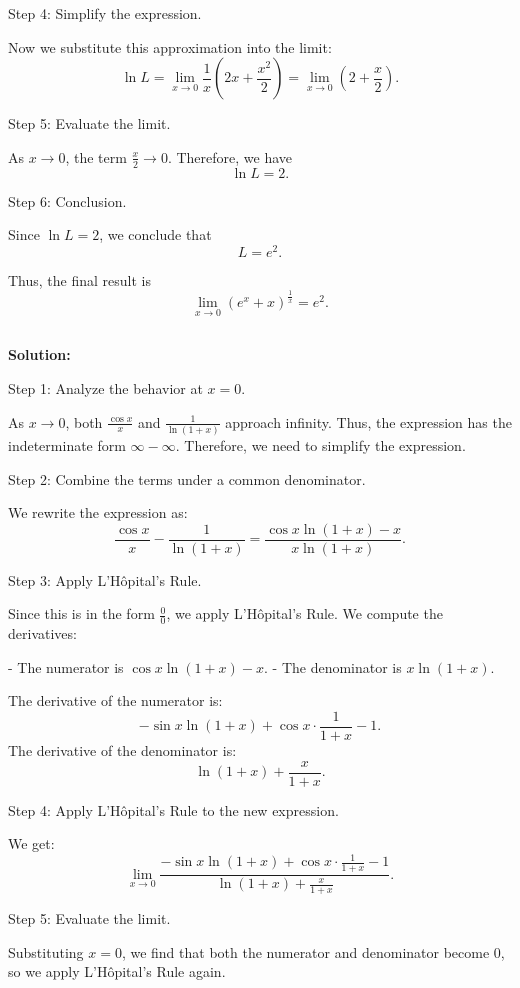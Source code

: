 \documentclass{article}
\begin{document}
Step 4: Simplify the expression.

Now we substitute this approximation into the limit:
\[
\ln L = \lim_{x \to 0} \frac{1}{x} \left( 2x + \frac{x^2}{2} \right) = \lim_{x \to 0} \left( 2 + \frac{x}{2} \right).
\]

Step 5: Evaluate the limit.

As \( x \to 0 \), the term \( \frac{x}{2} \to 0 \). Therefore, we have
\[
\ln L = 2.
\]

Step 6: Conclusion.

Since \( \ln L = 2 \), we conclude that
\[
L = e^2.
\]

Thus, the final result is
\[
\lim_{x \to 0} \left( e^x + x \right)^{\frac{1}{x}} = e^2.
\]

\subsection{}	
\textbf{Solution:}

Step 1: Analyze the behavior at \(x = 0\).

As \( x \to 0 \), both \( \frac{\cos x}{x} \) and \( \frac{1}{\ln(1+x)} \) approach infinity. Thus, the expression has the indeterminate form \( \infty - \infty \). Therefore, we need to simplify the expression.

Step 2: Combine the terms under a common denominator.

We rewrite the expression as:
\[
\frac{\cos x}{x} - \frac{1}{\ln(1+x)} = \frac{\cos x \ln(1+x) - x}{x \ln(1+x)}.
\]

Step 3: Apply L'Hôpital's Rule.

Since this is in the form \( \frac{0}{0} \), we apply L'Hôpital's Rule. We compute the derivatives:

- The numerator is \( \cos x \ln(1+x) - x \).
- The denominator is \( x \ln(1+x) \).

The derivative of the numerator is:
\[
-\sin x \ln(1+x) + \cos x \cdot \frac{1}{1+x} - 1.
\]
The derivative of the denominator is:
\[
\ln(1+x) + \frac{x}{1+x}.
\]

Step 4: Apply L'Hôpital's Rule to the new expression.

We get:
\[
\lim_{x \to 0} \frac{-\sin x \ln(1+x) + \cos x \cdot \frac{1}{1+x} - 1}{\ln(1+x) + \frac{x}{1+x}}.
\]

Step 5: Evaluate the limit.

Substituting \( x = 0 \), we find that both the numerator and denominator become 0, so we apply L'Hôpital's Rule again.
\end{document}
